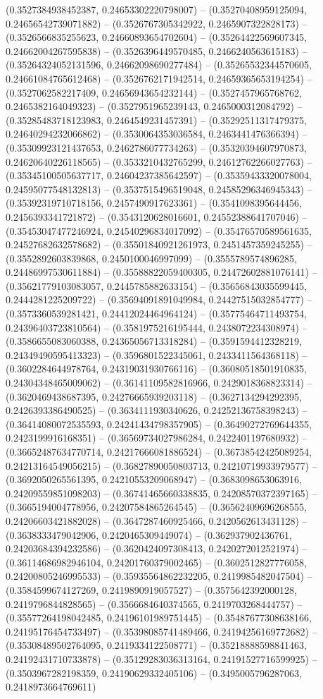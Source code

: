(0.3527384938452387, 0.24653302220798007) -- (0.35270408959125094, 0.24656542739071882) -- (0.3526767305342922, 0.2465907322828173) -- (0.3526566835255623, 0.24660893654702604) -- (0.35264422569607345, 0.24662004267595838) -- (0.3526396449570485, 0.2466240563615183) -- (0.35264324052131596, 0.24662098690277484) -- (0.35265532344570605, 0.24661084765612468) -- (0.3526762171942514, 0.24659365653194254) -- (0.3527062582217409, 0.24656943654232144) -- (0.3527457965768762, 0.2465382164049323) -- (0.3527951965239143, 0.2465000312084792) -- (0.35285483718123983, 0.2464549231457391) -- (0.35292511317479375, 0.24640294232066862) -- (0.3530064353036584, 0.2463441476366394) -- (0.35309923121437653, 0.2462786077734263) -- (0.35320394607970873, 0.24620640226118565) -- (0.3533210432765299, 0.24612762266027763) -- (0.35345100505637717, 0.24604237385642597) -- (0.35359433320078004, 0.24595077548132813) -- (0.3537515496519048, 0.24585296346945343) -- (0.35392319710718156, 0.2457490917623361) -- (0.3541098395644456, 0.2456393341721872) -- (0.3543120628016601, 0.24552388641707046) -- (0.35453047477246924, 0.24540296834017092) -- (0.35476570589561635, 0.24527682632578682) -- (0.35501840921261973, 0.2451457359245255) -- (0.3552892603839868, 0.2450100046997099) -- (0.3555789574896285, 0.24486997530611884) -- (0.35588822059400305, 0.24472602881076141) -- (0.35621779103083057, 0.2445785882633154) -- (0.35656843035599445, 0.2444281225209722) -- (0.35694091891049984, 0.24427515032854777) -- (0.3573360539281421, 0.24412024464964124) -- (0.35775464711493754, 0.24396403723810564) -- (0.3581975216195444, 0.2438072234308974) -- (0.3586655083060388, 0.24365056713318284) -- (0.3591594412328219, 0.24349490595413323) -- (0.3596801522345061, 0.2433411564368118) -- (0.3602284644978764, 0.24319031930766116) -- (0.36080518501910835, 0.24304348465009062) -- (0.36141109582816966, 0.2429018368823314) -- (0.3620469438687395, 0.24276665939203118) -- (0.3627134294292395, 0.2426393386490525) -- (0.3634111930340626, 0.24252136758398243) -- (0.36414080072535593, 0.24241434798357905) -- (0.36490272769644355, 0.2423199916168351) -- (0.36569734027986284, 0.2422401197680932) -- (0.36652487634770714, 0.24217666081886524) -- (0.36738542425089254, 0.24213164549056215) -- (0.36827890050803713, 0.24210719933979577) -- (0.3692050265561395, 0.24210553209068947) -- (0.3683098653063916, 0.24209559851098203) -- (0.36741465660338835, 0.24208570372397165) -- (0.3665194004778956, 0.24207584865264545) -- (0.36562409696268555, 0.24206603421882028) -- (0.3647287460925466, 0.2420562613431128) -- (0.3638333479042906, 0.2420465309449074) -- (0.362937902436761, 0.24203684394232586) -- (0.3620424097308413, 0.2420272012521974) -- (0.36114686982946104, 0.24201760379002465) -- (0.3602512827776058, 0.24200805246995533) -- (0.35935564862232205, 0.2419985482047504) -- (0.3584599674127269, 0.2419890919057527) -- (0.3575642392000128, 0.2419796844828565) -- (0.3566684640374565, 0.2419703268444757) -- (0.35577264198042485, 0.24196101989751445) -- (0.35487677308638166, 0.24195176454733497) -- (0.35398085741489466, 0.24194256169772682) -- (0.35308489502764095, 0.2419334122508771) -- (0.35218888598841463, 0.24192431710733878) -- (0.35129283036313164, 0.24191527716599925) -- (0.3503967282198359, 0.24190629332405106) -- (0.3495005796287063, 0.2418973664769611) 